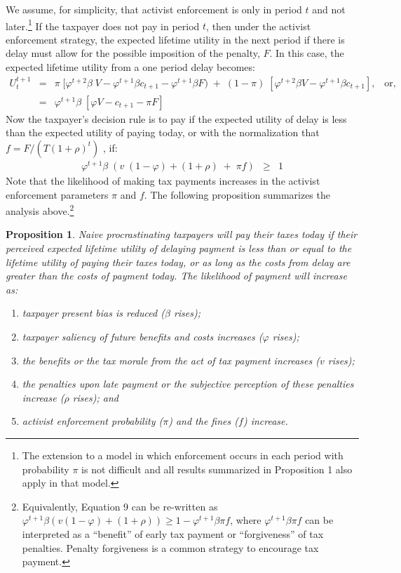 \documentclass[12pt]{article}
\newtheorem{prop}{Proposition}
\begin{document}
We assume, for simplicity, that activist enforcement is only in period
$t$ and not later.\footnote{The extension to a model in which
  enforcement occurs in each period with probability $\pi$ is not
  difficult and all results summarized in Proposition 1 also apply in
  that model.}  If the taxpayer does not pay in period $t$, then
under the activist enforcement strategy, the expected lifetime utility
in the next period if there is delay must allow for the possible
imposition of the penalty, $F$.  In this case, the expected lifetime
utility from a one period delay becomes:
\begin{eqnarray}\label{eq8}
U_t^{t+1} &=& \pi  \; [\varphi^{t+2} \beta \; V - \varphi^{t+1} \beta c_
  {t+1} - \varphi^{t+1} \beta F ) \; +  \; (1-\pi) \;  [\varphi^{t+2} \beta V -
    \varphi^{t+1} \beta c_ {t+1}], \; \; \; \mbox{or}, \nonumber  \\ 
&=& \varphi^{t+1} \beta \; [ \varphi V - c_ {t+1} - \pi F ]
 \end{eqnarray}
Now the taxpayer's decision rule is to pay if the expected utility of
delay is less than the expected utility of paying today, or with the
normalization that $f = F/(T(1 + \rho)^{t})$ , if:
\begin{eqnarray}\label{eq9}
\varphi^{t+1} \beta \; (v \; (1-\varphi) + (1 + \rho) \; + \; \pi f)
&\ge& 1
\end{eqnarray}
Note that the likelihood of making tax payments increases in the
activist enforcement parameters $\pi$ and $f$. The following proposition  
summarizes the analysis above.\footnote{Equivalently, Equation 9 can be re-written as $\varphi^{t+1} \beta (v (1-\varphi) + (1 + \rho) ) \ge 1 - \varphi^{t+1}\beta\pi f$, where $\varphi^{t+1}\beta\pi f$ can be interpreted as a ``benefit'' of early tax payment or ``forgiveness'' of tax penalties. Penalty forgiveness is a common strategy to encourage tax payment. }
\begin{prop}
Naive procrastinating taxpayers will pay their taxes today if their
perceived expected lifetime utility of delaying payment is less
than or equal to the lifetime utility of paying their taxes today, or as long as the costs from delay are greater than the costs of payment today. The likelihood of payment will increase as:
\begin{enumerate}
\item taxpayer present bias is reduced ($\beta$ rises); 
\item taxpayer saliency of future benefits and costs increases
  ($\varphi$ rises);
\item the benefits or the tax morale from the act of tax payment increases ($v$ rises);
\item the  penalties upon late payment or the subjective perception of these penalties increase
  ($\rho$ rises); and
\item activist enforcement probability ($\pi$) and the fines ($f$) increase.
\end{enumerate}
\end{prop}
\end{document}
